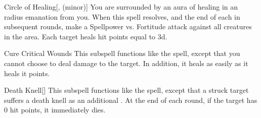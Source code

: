\begin{ability}[\nth{4}]{Circle of Healing}[,  (minor)]
You are surrounded by an aura of healing in an \areamed radius emanation from you.
When this spell resolves, and the end of each  in subsequent rounds, make a Spellpower vs. Fortitude attack against all creatures in the area.
\hit Each target heals hit points equal to  \minus3d.
\end{ability}
\vspace{0.25em}


\begin{ability}[\nth{4}]{Cure Critical Wounds}
This subspell functions like the  spell, except that you cannot choose to deal damage to the target.
In addition, it heals  as easily as it heals it points.
\end{ability}
\vspace{0.25em}


\begin{ability}[\nth{4}]{Death Knell}[]
This subspell functions like the  spell, except that a struck target suffers a death knell as an additional .
At the end of each round, if the target has 0 hit points, it immediately dies.
\end{ability}
\vspace{0.25em}

